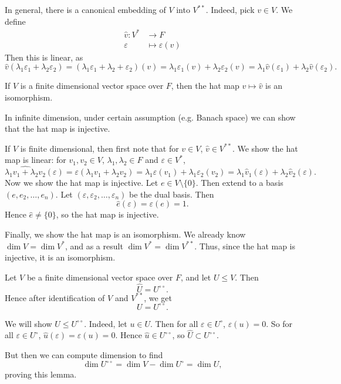 \documentclass[12pt]{article}
\begin{document}
In general, there is a canonical embedding of $V$ into $V^{\ast \ast}$. Indeed, pick $v \in V$. We define
\begin{align*}
	\hat v : V^{\ast} &\to F \\
	\varepsilon &\mapsto \varepsilon(v)
\end{align*}
Then this is linear, as
\[
	\hat v(\lambda_1 \varepsilon_1 + \lambda_2 \varepsilon_2) = (\lambda_1 \varepsilon_1 + \lambda_2 + \varepsilon_2)(v) = \lambda_1 \varepsilon_1(v) + \lambda_2 \varepsilon_2(v) = \lambda_1 \hat v(\varepsilon_1) + \lambda_2 \hat v(\varepsilon_2)
.\]

\begin{theorem}
	If $V$ is a finite dimensional vector space over $F$, then the hat map $v \mapsto \hat v$ is an isomorphism.
\end{theorem}

In infinite dimension, under certain assumption (e.g. Banach space) we can show that the hat map is injective.

\begin{proofbox}
	If $V$ is finite dimensional, then first note that for $v \in V$, $\hat v \in V^{\ast \ast}$. We show the hat map is linear: for $v_1, v_2 \in V$, $\lambda_1, \lambda_2 \in F$ and $\varepsilon \in V^{\ast}$,
	\[
		\widehat{\lambda_1 v_1 + \lambda_2 v_2} (\varepsilon) = \varepsilon(\lambda_1 v_1 + \lambda_2 v_2) = \lambda_1 \varepsilon(v_1) + \lambda_1 \varepsilon_2(v_2) = \lambda_1 \hat v_1(\varepsilon) + \lambda_2 \hat v_2 (\varepsilon)
	.\]
	Now we show the hat map is injective. Let $e \in V \setminus \{0\}$. Then extend to a basis $(e, e_2, \ldots, e_n)$. Let $(\varepsilon, \varepsilon_2, \ldots, \varepsilon_n)$ be the dual basis. Then
	\[
		\hat e (\varepsilon) = \varepsilon(e) = 1
	.\]
	Hence $\hat e \neq \{0\}$, so the hat map is injective.

	Finally, we show the hat map is an isomorphism. We already know $\dim V = \dim V^{\ast}$, and as a result $\dim V^{\ast} = \dim V^{\ast \ast}$. Thus, since the hat map is injective, it is an isomorphism.
\end{proofbox}

\begin{lemma}
	Let $V$ be a finite dimensional vector space over $F$, and let $U \leq V$. Then
	\[
	\hat U = U^{\circ \circ}
	.\]
	Hence after identification of $V$ and $V^{\ast \ast}$, we get
	\[
	U = U^{\circ \circ}
	.\]
\end{lemma}

\begin{proofbox}
	We will show $U \leq U^{\circ \circ}$. Indeed, let $u \in U$. Then for all $\varepsilon \in U^{\circ}$, $\varepsilon(u) = 0$. So for all $\varepsilon \in U^{\circ}$, $\hat u(\varepsilon) = \varepsilon(u) = 0$. Hence $\hat u \in U^{\circ \circ}$, so $\hat U \subset U^{\circ \circ}$.

	But then we can compute dimension to find
	\[
	\dim U^{\circ \circ} = \dim V - \dim U^{\circ} = \dim U
	,\]
	proving this lemma.
\end{proofbox}
\end{document}
